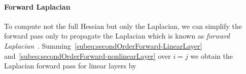 \paragraph{Forward Laplacian}
To compute not the full Hessian but only the Laplacian, we can simplify the forward pass only to propagate the Laplacian which is known as \emph{forward Laplacian}~\citep{li2023forward}. 
Summing~\eqref{subeq:secondOrderForward-LinearLayer} and~\eqref{subeq:secondOrderForward-nonlinearLayer} over $i=j$ we obtain the Laplacian forward pass for linear layers by
\begin{comment}
    \begin{align}
  \mZ^{(l)}\coloneqq %
  \begin{pmatrix}
    \vz^{(l)}
    \\
    \partial_{\vx_1} \vz^{(l)}
    \\
    \vdots
    \\
    \partial_{\vx_d} \vz^{(l)}
    \\
    \Delta_\vx\vz^{(l)}
  \end{pmatrix}
  & =
    \begin{pmatrix}
    \mW^{(l)}\vz^{(l-1)}
    \\
    \mW^{(l)}\partial_{\vx_1} \vz^{(l-1)}
    \\
    \vdots
    \\
    \mW^{(l)}\partial_{\vx_d} \vz^{(l-1)}
    \\
    \mW^{(l)}\Delta_\vx\vz^{(l-1)}
  \end{pmatrix}
    \label{eq:forward-laplacian-linear-layer-compact}
\end{align}
\end{comment}
